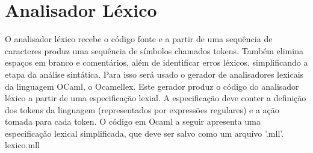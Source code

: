 \documentclass[12pt,a4paper,twoside]{article}
\begin{document}
\section{Analisador Léxico}
O analisador léxico recebe o código fonte e a partir de uma sequência de caracteres produz uma sequência de símbolos chamados tokens. Também elimina espaços em branco e comentários, além de identificar erros léxicos, simplificando a etapa da análise sintática. 
\newline
Para isso será usado o gerador de analisadores lexicais da linguagem OCaml, o Ocamellex. Este gerador produz o código do analisador léxico a partir de uma especificação lexial.
\newline
A especificação deve conter a definição dos tokens da linguagem (representados por expressões regulares) e a ação tomada para cada token.
\newline
O código em Ocaml a seguir apresenta uma especificação lexical simplificada, que deve ser salvo como um arquivo '.mll'.\newline
\newline
lexico.mll
\end{document}

